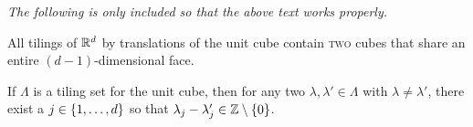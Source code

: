 \documentclass[../thesis.tex]{subfiles}
\begin{document}
\emph{The following is only included so that the above text works properly.}
\begin{conjecture}\label{conj:keller_tiling}
    All tilings of $\mathbb{R}^d$ by translations of the unit cube contain \textsc{two} cubes that share an entire $(d-1)$-dimensional face.
\end{conjecture}  %
\begin{theorem}\label{thrm:keller_tiling}
    If $\Lambda$ is a tiling set for the unit cube, then for any two $\lambda, \lambda' \in \Lambda$ with $\lambda\neq\lambda'$, there exist a $j\in \{1,\dots,d\}$ so that $\lambda_j-\lambda_j' \in \mathbb{Z}\setminus\{0\}$.
\end{theorem}
\clearpage
\end{document}
